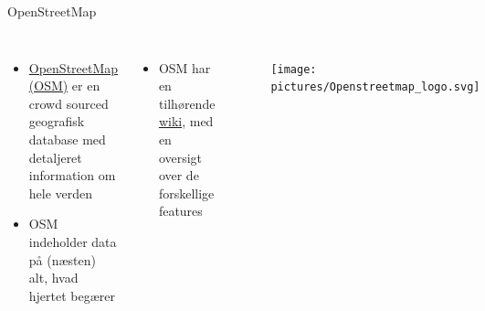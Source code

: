 \documentclass[
  8pt,
  ignorenonframetext,
  aspectratio=169]{beamer}
\providecommand{\tightlist}{%
  \setlength{\itemsep}{0pt}\setlength{\parskip}{0pt}}
\newcommand{\columnsbegin}{\begin{columns}}
\newcommand{\columnsend}{\end{columns}}
\begin{document}
\begin{frame}{OpenStreetMap}
\protect\hypertarget{openstreetmap}{}
\columnsbegin


\begin{itemize}
\item
  \href{https://www.openstreetmap.org/about}{OpenStreetMap (OSM)} er en
  crowd sourced geografisk database med detaljeret information om hele
  verden
\item
  OSM indeholder data på (næsten) alt, hvad hjertet begærer
\end{itemize}

\bigskip

\begin{itemize}
\tightlist
\item
  OSM har en tilhørende
  \href{https://wiki.openstreetmap.org/wiki/Map_features}{wiki}, med en
  oversigt over de forskellige features
\end{itemize}


\begin{figure}[H]
    \centering
    \texttt{[image: pictures/Openstreetmap\_logo.svg]}
\end{figure}

\columnsend
\end{frame}
\end{document}
